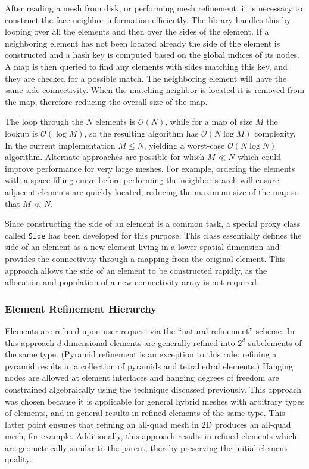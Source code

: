 After reading a mesh from disk, or performing mesh refinement, it is
necessary to construct the face neighbor information efficiently.  The
library handles this by looping over all the elements and then over
the sides of the element.  If a neighboring element has not been
located already the side of the element is constructed and a hash key
is computed based on the global indices of its nodes.  A map is then
queried to find any elements with sides matching this key, and they
are checked for a possible match. The neighboring element will have
the same side connectivity.  When the matching neighbor is located it
is removed from the map, therefore reducing the overall size of the
map.

The loop through the $N$ elements is $\mathcal{O}(N)$, while for a map
of size $M$ the lookup is $\mathcal{O}(\log M)$, so the resulting
algorithm has $\mathcal{O}(N\log M)$ complexity. In the current
implementation $M \le N$, yielding a worst-case
$\mathcal{O}(N\log N)$ algorithm.  Alternate approaches are possible
for which $M \ll N$ which could improve performance for very large
meshes.  For example, ordering the elements with a space-filling curve
before performing the neighbor search will ensure adjacent elements
are quickly located, reducing the maximum size of the map so that $M \ll N$.

Since constructing the side of an element is a common task, a special
proxy class called \texttt{Side} has been developed for this purpose.
This class essentially defines the side of an element as a new element
living in a lower spatial dimension and provides the connectivity
through a mapping from the original element.  This approach allows the
side of an element to be constructed rapidly, as the allocation and
population of a new connectivity array is not required.

\subsubsection{Element Refinement Hierarchy\label{sec:elements_hierarchy}}
Elements are refined upon user request via the ``natural refinement''
scheme.  In this approach $d$-dimensional elements are generally
refined into $2^d$ subelements of the same type. (Pyramid refinement
is an exception to this rule: refining a pyramid results in a
collection of pyramids and tetrahedral elements.)  Hanging nodes are
allowed at element interfaces and hanging degrees of freedom are
constrained algebraically using the technique discussed
previously. This approach was chosen because it is applicable for
general hybrid meshes with arbitrary types of elements, and in general
results in refined elements of the same type.  This latter point
ensures that refining an all-quad mesh in 2D produces an all-quad
mesh, for example.  Additionally, this approach results in refined
elements which are geometrically similar to the parent, thereby
preserving the initial element quality.

